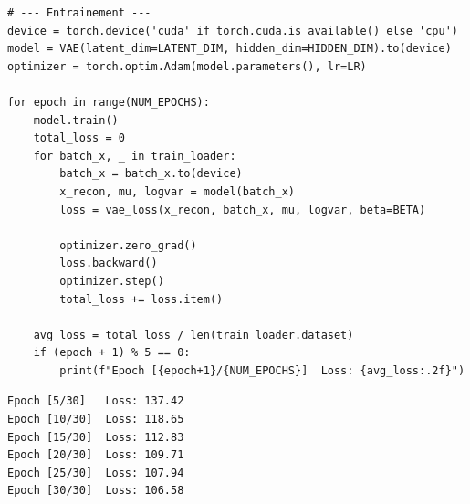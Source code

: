 \begin{codeblock}[title=\textbf{VAE complet avec entra\^inement et visualisation}]
\begin{verbatim}
# --- Entrainement ---
device = torch.device('cuda' if torch.cuda.is_available() else 'cpu')
model = VAE(latent_dim=LATENT_DIM, hidden_dim=HIDDEN_DIM).to(device)
optimizer = torch.optim.Adam(model.parameters(), lr=LR)

for epoch in range(NUM_EPOCHS):
    model.train()
    total_loss = 0
    for batch_x, _ in train_loader:
        batch_x = batch_x.to(device)
        x_recon, mu, logvar = model(batch_x)
        loss = vae_loss(x_recon, batch_x, mu, logvar, beta=BETA)

        optimizer.zero_grad()
        loss.backward()
        optimizer.step()
        total_loss += loss.item()

    avg_loss = total_loss / len(train_loader.dataset)
    if (epoch + 1) % 5 == 0:
        print(f"Epoch [{epoch+1}/{NUM_EPOCHS}]  Loss: {avg_loss:.2f}")
\end{verbatim}
\end{codeblock}

\begin{codeoutput}
\begin{verbatim}
Epoch [5/30]   Loss: 137.42
Epoch [10/30]  Loss: 118.65
Epoch [15/30]  Loss: 112.83
Epoch [20/30]  Loss: 109.71
Epoch [25/30]  Loss: 107.94
Epoch [30/30]  Loss: 106.58
\end{verbatim}
\end{codeoutput}

